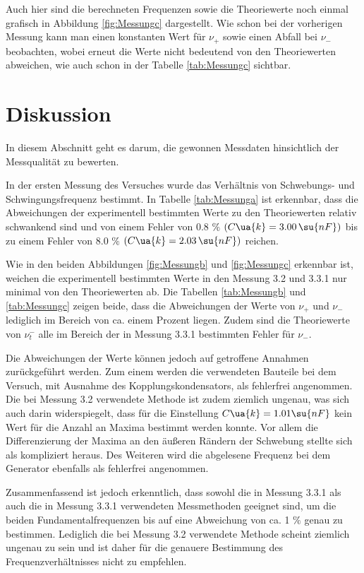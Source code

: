 Auch hier sind die berechneten Frequenzen sowie die Theoriewerte noch einmal grafisch
in Abbildung \ref{fig:Messungc} dargestellt. Wie schon bei der vorherigen Messung
kann man einen konstanten Wert für $\nu_{+}$ sowie einen
Abfall bei $\nu_{-}$ beobachten, wobei erneut die Werte nicht bedeutend von den
Theoriewerten abweichen, wie auch schon in der Tabelle \ref{tab:Messungc}
sichtbar.

\section{Diskussion}

In diesem Abschnitt geht es darum, die gewonnen Messdaten hinsichtlich der
Messqualität zu bewerten.

In der ersten Messung des Versuches wurde das Verhältnis von Schwebungs- und
Schwingungsfrequenz bestimmt. In Tabelle \ref{tab:Messunga} ist erkennbar, dass
die Abweichungen der experimentell bestimmten Werte zu den Theoriewerten relativ
schwankend sind und von einem Fehler von 0.8 $\%$ $(C\ua{k} = 3.00 \, \su{nF})$ bis
zu einem Fehler von 8.0 $\%$ $(C\ua{k} = 2.03 \, \su{nF})$ reichen.

Wie in den beiden Abbildungen \ref{fig:Messungb} und \ref{fig:Messungc} erkennbar
ist, weichen die experimentell bestimmten Werte in den Messung 3.2 und 3.3.1
nur minimal von den Theoriewerten
ab. Die Tabellen \ref{tab:Messungb} und \ref{tab:Messungc} zeigen beide, dass die
Abweichungen der Werte von $\nu_{+}$ und $\nu_{-}$ lediglich im Bereich von ca.
einem Prozent liegen. Zudem sind die Theoriewerte von $\nu_t^{-}$ alle im Bereich
der in Messung 3.3.1 bestimmten Fehler für $\nu_{-}$.

Die Abweichungen der Werte können jedoch auf getroffene Annahmen zurückgeführt
werden. Zum einem werden die verwendeten Bauteile bei dem Versuch, mit Ausnahme
des Kopplungskondensators, als fehlerfrei angenommen.
Die bei Messung 3.2 verwendete Methode ist zudem ziemlich ungenau, was sich auch
darin widerspiegelt, dass für die Einstellung $C\ua{k} = 1.01 \su{nF}$ kein
Wert für die Anzahl an Maxima bestimmt werden konnte. Vor allem die Differenzierung
der Maxima an den äußeren Rändern der Schwebung stellte sich als kompliziert
heraus. Des Weiteren wird die abgelesene Frequenz bei dem Generator ebenfalls als
fehlerfrei angenommen.

Zusammenfassend ist jedoch erkenntlich, dass sowohl die in Messung 3.3.1 als auch die
in Messung 3.3.1 verwendeten Messmethoden geeignet sind, um die beiden Fundamentalfrequenzen
bis auf eine Abweichung von ca. 1 $\%$ genau zu bestimmen. Lediglich die bei Messung 3.2 verwendete Methode
scheint ziemlich ungenau zu sein und ist daher für die genauere Bestimmung des
Frequenzverhältnisses nicht zu empfehlen.
